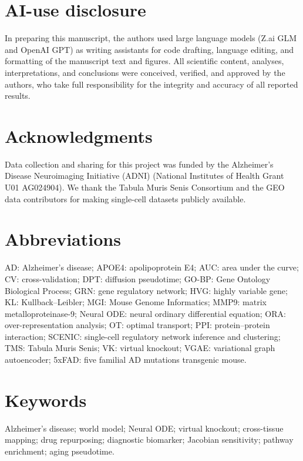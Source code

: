 \documentclass[12pt,a4paper]{article}
\begin{document}
\section*{AI-use disclosure}
In preparing this manuscript, the authors used large language models (Z.ai GLM and OpenAI GPT) as writing assistants for code drafting, language editing, and formatting of the manuscript text and figures. All scientific content, analyses, interpretations, and conclusions were conceived, verified, and approved by the authors, who take full responsibility for the integrity and accuracy of all reported results.

\section*{Acknowledgments}
Data collection and sharing for this project was funded by the Alzheimer's Disease Neuroimaging Initiative (ADNI) (National Institutes of Health Grant U01 AG024904). We thank the Tabula Muris Senis Consortium and the GEO data contributors for making single-cell datasets publicly available.

\section*{Abbreviations}
AD: Alzheimer's disease; APOE4: apolipoprotein E4; AUC: area under the curve; CV: cross-validation; DPT: diffusion pseudotime; GO-BP: Gene Ontology Biological Process; GRN: gene regulatory network; HVG: highly variable gene; KL: Kullback--Leibler; MGI: Mouse Genome Informatics; MMP9: matrix metalloproteinase-9; Neural ODE: neural ordinary differential equation; ORA: over-representation analysis; OT: optimal transport; PPI: protein--protein interaction; SCENIC: single-cell regulatory network inference and clustering; TMS: Tabula Muris Senis; VK: virtual knockout; VGAE: variational graph autoencoder; 5xFAD: five familial AD mutations transgenic mouse.

\section*{Keywords}
Alzheimer's disease; world model; Neural ODE; virtual knockout; cross-tissue mapping; drug repurposing; diagnostic biomarker; Jacobian sensitivity; pathway enrichment; aging pseudotime.
\end{document}
